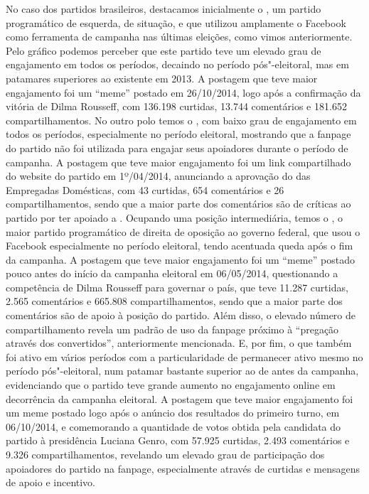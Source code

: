 No caso dos partidos brasileiros, destacamos inicialmente o , um
partido programático de esquerda, de situação, e que utilizou amplamente
o Facebook como ferramenta de campanha nas últimas eleições, como vimos
anteriormente. Pelo gráfico podemos perceber que este partido teve um
elevado grau de engajamento em todos os períodos, decaindo no período
pós"-eleitoral, mas em patamares superiores ao existente em 2013. A
postagem que teve maior engajamento foi um ``meme'' postado em
26/10/2014, logo após a confirmação da vitória de Dilma Rousseff, com
136.198 curtidas, 13.744 comentários e 181.652 compartilhamentos. No
outro polo temos o , com baixo grau de engajamento em todos os
períodos, especialmente no período eleitoral, mostrando que a fanpage do
partido não foi utilizada para engajar seus apoiadores durante o período
de campanha. A postagem que teve maior engajamento foi um link
compartilhado do website do partido em 1º/04/2014, anunciando a
aprovação do  das Empregadas Domésticas, com 43 curtidas, 654
comentários e 26 compartilhamentos, sendo que a maior parte dos
comentários são de críticas ao partido por ter apoiado a . Ocupando
uma posição intermediária, temos o , o maior partido programático de
direita de oposição ao governo federal, que usou o Facebook
especialmente no período eleitoral, tendo acentuada queda após o fim da
campanha. A postagem que teve maior engajamento foi um ``meme'' postado
pouco antes do início da campanha eleitoral em 06/05/2014, questionando
a competência de Dilma Rousseff para governar o país, que teve 11.287
curtidas, 2.565 comentários e 665.808 compartilhamentos, sendo que a
maior parte dos comentários são de apoio à posição do partido. Além
disso, o elevado número de compartilhamento revela um padrão de uso da
fanpage próximo à ``pregação através dos convertidos'', anteriormente
mencionada. E, por fim, o  que também foi ativo em vários períodos
com a particularidade de permanecer ativo mesmo no período
pós"-eleitoral, num patamar bastante superior ao de antes da campanha,
evidenciando que o partido teve grande aumento no engajamento online em
decorrência da campanha eleitoral. A postagem que teve maior engajamento
foi um meme postado logo após o anúncio dos resultados do primeiro
turno, em 06/10/2014, e comemorando a quantidade de votos obtida pela
candidata do partido à presidência Luciana Genro, com 57.925 curtidas,
2.493 comentários e 9.326 compartilhamentos, revelando um
elevado grau de participação dos apoiadores do partido na fanpage,
especialmente através de curtidas e mensagens de apoio e incentivo.

